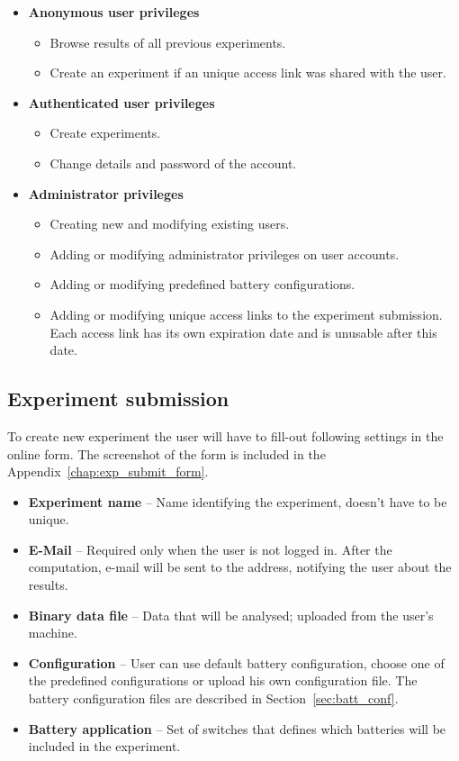 \documentclass[
	digital,    %
	oneside,    %
	color,
	11pt,
	nocover,
	notable,
	nolof,
	nolot,
]{fithesis3}
\theoremstyle{definition}
\theoremstyle{remark}
\begin{document}
\begin{itemize}
\item \textbf{Anonymous user privileges}
\begin{itemize}
\item Browse results of all previous experiments.
\item Create an experiment if an unique access link was shared with the user.
\end{itemize}
\pagebreak
\item \textbf{Authenticated user privileges}
\begin{itemize}
\item Create experiments.
\item Change details and password of the account.
\end{itemize}
\item \textbf{Administrator privileges}
\begin{itemize}
\item Creating new and modifying existing users.
\item Adding or modifying administrator privileges on user accounts.
\item Adding or modifying predefined battery configurations.
\item Adding or modifying unique access links to the experiment submission. Each access link has its own expiration date and is unusable after this date.
\end{itemize}
\end{itemize}

\subsection*{Experiment submission}
To create new experiment the user will have to fill-out following settings in the online form. The screenshot of the form is included in the Appendix~\ref{chap:exp_submit_form}.

\begin{itemize}
\item \textbf{Experiment name} -- Name identifying the experiment, doesn't have to be unique.
\item \textbf{E-Mail} -- Required only when the user is not logged in. After the computation, e-mail will be sent to the address, notifying the user about the results.
\item \textbf{Binary data file} -- Data that will be analysed; uploaded from the user's machine.
\item \textbf{Configuration} -- User can use default battery configuration, choose one of the predefined configurations or upload his own configuration file. The battery configuration files are described in Section~\ref{sec:batt_conf}.
\item \textbf{Battery application} -- Set of switches that defines which batteries will be included in the experiment.
\end{itemize}
\end{document}
